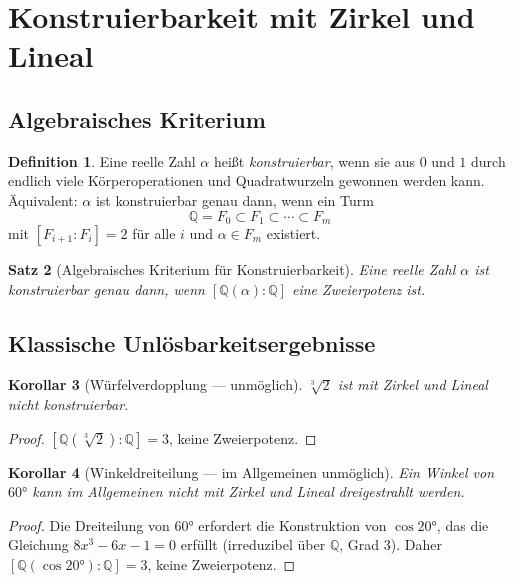 \documentclass[12pt,a4paper]{amsart}
\newtheorem{theorem}{Satz}[section]
\newtheorem{korollar}[theorem]{Korollar}
\theoremstyle{definition}
\newtheorem{definition}[theorem]{Definition}
\newcommand{\Q}{\mathbb{Q}}
\begin{document}
\section{Konstruierbarkeit mit Zirkel und Lineal}

\subsection{Algebraisches Kriterium}

\begin{definition}
Eine reelle Zahl $\alpha$ heißt \emph{konstruierbar}, wenn sie aus $0$ und $1$
durch endlich viele Körperoperationen und Quadratwurzeln gewonnen werden kann.
Äquivalent: $\alpha$ ist konstruierbar genau dann, wenn ein Turm
\[
  \Q = F_0 \subset F_1 \subset \cdots \subset F_m
\]
mit $[F_{i+1}:F_i] = 2$ für alle $i$ und $\alpha \in F_m$ existiert.
\end{definition}

\begin{theorem}[Algebraisches Kriterium für Konstruierbarkeit]
\label{thm:konstruierbar}
Eine reelle Zahl $\alpha$ ist konstruierbar genau dann, wenn $[\Q(\alpha):\Q]$
eine Zweierpotenz ist.
\end{theorem}

\subsection{Klassische Unlösbarkeitsergebnisse}

\begin{korollar}[Würfelverdopplung — unmöglich]
$\sqrt[3]{2}$ ist mit Zirkel und Lineal nicht konstruierbar.
\end{korollar}

\begin{proof}
$[\Q(\sqrt[3]{2}):\Q] = 3$, keine Zweierpotenz.
\end{proof}

\begin{korollar}[Winkeldreiteilung — im Allgemeinen unmöglich]
Ein Winkel von $60°$ kann im Allgemeinen nicht mit Zirkel und Lineal
dreigestrahlt werden.
\end{korollar}

\begin{proof}
Die Dreiteilung von $60°$ erfordert die Konstruktion von $\cos 20°$, das die
Gleichung $8x^3 - 6x - 1 = 0$ erfüllt (irreduzibel über $\Q$, Grad 3). Daher
$[\Q(\cos 20°):\Q] = 3$, keine Zweierpotenz.
\end{proof}
\end{document}

